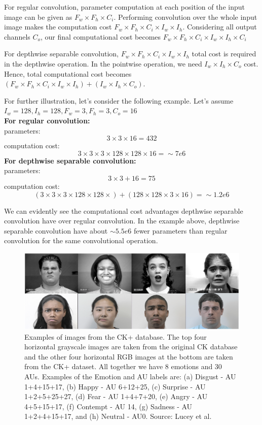 \documentclass[master]{thesis-uestc}
\begin{document}
For regular convolution, parameter computation at each position of the input image can be given as $F_w \times F_h \times C_i$. Performing convolution over the whole input image makes the computation cost $F_w \times F_h \times C_i \times I_w \times I_h$. Considering all output channels $C_o$, our final computational cost becomes $F_w \times F_h \times C_i \times I_w \times I_h \times C_i$

For depthwise separable convolution, $F_w \times F_h \times C_i \times I_w \times I_h$ total cost is required in the depthwise operation. In the pointwise operation, we need $I_w \times I_h \times C_o$ cost. Hence, total computational cost becomes $(F_w \times F_h \times C_i \times I_w \times I_h) + (I_w \times I_h \times C_o)$.

For further illustration, let's consider the following example. Let's assume $I_w = 128, I_h = 128, F_w = 3, F_h = 3, C_o = 16$ \\
\textbf{For regular convolution:} \\
parameters:
\[3 \times 3 \times 16 = 432\]
computation cost:
\[3 \times 3 \times 3 \times 128 \times 128 \times 16 = \sim7e6\]
\textbf{For depthwise separable convolution:}\\
parameters:
\[3 \times 3 + 16 = 75 \]
computation cost:
\[(3 \times 3 \times 3 \times 128 \times 128 \times) + (128 \times 128 \times 3 \times 16) = \sim1.2e6 \]

We can evidently see the computational cost advantages depthwise separable convolution have over regular convolution. In the example above, depthwise separable convolution have about $\sim5.5e6$ fewer parameters than regular convolution for the same convolutional operation.

\begin{figure}[ht]
\includegraphics[width=5in]{pic/ck+.PNG}
\caption{Examples of images from the CK+ database. The top four horizontal grayscale images are taken from the original CK database and the other four horizontal RGB images at the bottom are taken from the CK+ dataset. All together we have 8 emotions and 30 AUs. Examples of the Emotion and AU labels
are: (a) Disgust - AU 1+4+15+17, (b) Happy - AU 6+12+25, (c) Surprise - AU 1+2+5+25+27, (d) Fear - AU 1+4+7+20, (e) Angry - AU 4+5+15+17, (f) Contempt - AU 14, (g) Sadness - AU 1+2+4+15+17, and (h) Neutral - AU0. Source: Lucey et al.}
\label{CK+_images}
\end{figure}
\end{document}
